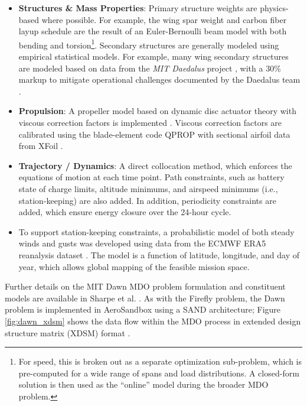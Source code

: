 \begin{example}
\begin{itemize}
\begin{itemize}
            \item \textbf{Structures \& Mass Properties}: Primary structure weights are physics-based where possible. For example, the wing spar weight and carbon fiber layup schedule are the result of an Euler-Bernoulli beam model with both bending and torsion\footnote{For speed, this is broken out as a separate optimization sub-problem, which is pre-computed for a wide range of spans and load distributions. A closed-form solution is then used as the ``online'' model during the broader MDO problem.}. Secondary structures are generally modeled using empirical statistical models. For example, many wing secondary structures are modeled based on data from the \emph{MIT Daedalus} project \cite{cruz_weight_1989, cruz_structural_1989, langford_feasibility_1986}, with a 30\% markup to mitigate operational challenges documented by the Daedalus team \cite{langford_daedalus_1989}.

            \item \textbf{Propulsion}: A propeller model based on dynamic disc actuator theory with viscous correction factors is implemented \cite{unified_propellers}. Viscous correction factors are calibrated using the blade-element code QPROP with sectional airfoil data from XFoil \cite{drela_xfoil_1989, qprop}.

            \item \textbf{Trajectory / Dynamics}: A direct collocation method, which enforces the equations of motion at each time point. Path constraints, such as battery state of charge limits, altitude minimums, and airspeed minimums (i.e., station-keeping) are also added. In addition, periodicity constraints are added, which ensure energy closure over the 24-hour cycle.

            \item To support station-keeping constraints, a probabilistic model of both steady winds and gusts was developed using data from the ECMWF ERA5 reanalysis dataset \cite{era5}. The model is a function of latitude, longitude, and day of year, which allows global mapping of the feasible mission space.

        \end{itemize}

    \end{itemize}

\end{example}

Further details on the MIT Dawn MDO problem formulation and constituent models are available in Sharpe et al. \cite{sharpe_optimization_2021}. As with the Firefly problem, the Dawn problem is implemented in AeroSandbox using a SAND architecture; Figure \ref{fig:dawn_xdsm} shows the data flow within the MDO process in extended design structure matrix (XDSM) format \cite{xdsm}.

